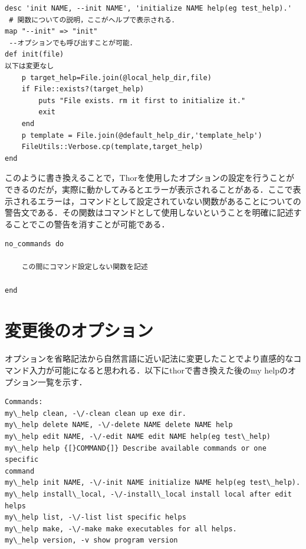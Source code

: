 \begin{screen}
{\small
\begin{verbatim}
desc 'init NAME, --init NAME', 'initialize NAME help(eg test_help).'
 # 関数についての説明，ここがヘルプで表示される．
map "--init" => "init"
 --オプションでも呼び出すことが可能．
def init(file)
以下は変更なし
    p target_help=File.join(@local_help_dir,file)
    if File::exists?(target_help)
        puts "File exists. rm it first to initialize it."
        exit
    end
    p template = File.join(@default_help_dir,'template_help')
    FileUtils::Verbose.cp(template,target_help)
end
\end{verbatim}}
\end{screen}

このように書き換えることで，Thorを使用したオプションの設定を行うことができるのだが，実際に動かしてみるとエラーが表示されることがある．ここで表示されるエラーは，コマンドとして設定されていない関数があることについての警告文である．その関数はコマンドとして使用しないということを明確に記述することでこの警告を消すことが可能である．

\begin{screen}
{\small
\begin{verbatim}
no_commands do

    この間にコマンド設定しない関数を記述

end
\end{verbatim}}
\end{screen}

\section{変更後のオプション}\label{}

オプションを省略記法から自然言語に近い記法に変更したことでより直感的なコマンド入力が可能になると思われる．以下にthorで書き換えた後のmy helpのオプション一覧を示す．

\begin{screen}
{\small
\begin{verbatim}
Commands:
my\_help clean, -\/-clean clean up exe dir.
my\_help delete NAME, -\/-delete NAME delete NAME help
my\_help edit NAME, -\/-edit NAME edit NAME help(eg test\_help)
my\_help help {[}COMMAND{]} Describe available commands or one specific
command
my\_help init NAME, -\/-init NAME initialize NAME help(eg test\_help).
my\_help install\_local, -\/-install\_local install local after edit
helps
my\_help list, -\/-list list specific helps
my\_help make, -\/-make make executables for all helps.
my\_help version, -v show program version
\end{verbatim}}
\end{screen}
    